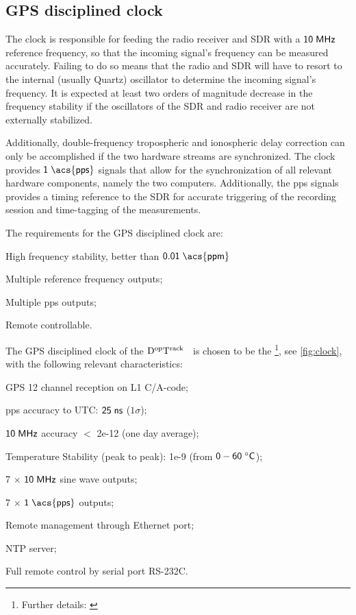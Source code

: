 \documentclass[11pt,a4paper,oneside]{article}
\newcommand{\GroundStationName}{${\rm D^{\rm op}T^{\rm rack}}$}
\newcommand{\listskip}{0pt}
\newenvironment{itemize*}
{\begin{itemize}
  \setlength{\itemsep}{\listskip}
  \setlength{\parskip}{\listskip}
  \setlength{\parsep}{\listskip}}
{\end{itemize}}
\newcommand{\unit}[2]{$ {\sf #1}\thickspace{\sf #2}$}
\begin{document}
\subsection{\acs{GPS} disciplined clock}

The clock is responsible for feeding the radio receiver and \ac{SDR} with a \unit{10}{MHz} reference frequency, so that the incoming signal's frequency can be measured accurately. Failing to do so means that the radio and \ac{SDR} will have to resort to the internal (usually Quartz) oscillator to determine the incoming signal's frequency. It is expected at least two orders of magnitude decrease in the frequency stability if the oscillators of the \ac{SDR} and radio receiver are not externally stabilized.

Additionally, double-frequency tropospheric and ionospheric delay correction can only be accomplished if the two hardware streams are synchronized. The clock provides \unit{1}{\acs{pps}} signals that allow for the synchronization of all relevant hardware components, namely the two computers. Additionally, the \ac{pps} signals provides a timing reference to the \ac{SDR} for accurate triggering of the recording session and time-tagging of the measurements.

The requirements for the \acs{GPS} disciplined clock are:

\begin{itemize*}
\item High frequency stability, better than \unit{0.01}{\acs{ppm}}
\item Multiple reference frequency outputs;
\item Multiple \ac{pps} outputs;
\item Remote controllable.
\end{itemize*}

The \acs{GPS} disciplined clock of the \GroundStationName~ is chosen to be the \modelclock\footnote{Further details: \href{\specsclock}{\specsclockshorturl}}, see \ref{fig:clock}, with the following relevant characteristics:

\begin{itemize*}
\item \ac{GPS} 12 channel reception on \ac{L1} \ac{C/A-code};
\item \ac{pps} accuracy to \ac{UTC}: \unit{25}{ns} ($1\sigma$);
\item \unit{10}{MHz} accuracy $<$ 2e-12 (one day average);
\item Temperature Stability (peak to peak): 1e-9 (from \unit{0 - 60}{^\circ C});
\item 7 $\times$ \unit{10}{MHz} sine wave outputs;
\item 7 $\times$ \unit{1}{\acs{pps}} outputs;
\item Remote management through Ethernet port;
\item \ac{NTP} server;
\item Full remote control by serial port RS-232C.
\end{itemize*}
\end{document}
